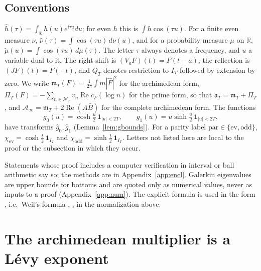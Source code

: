 \documentclass[11pt]{amsart}
\theoremstyle{definition}
\theoremstyle{remark}
\newcommand{\R}{\mathbb R}
\newcommand{\Rel}{\operatorname{Re}}
\newcommand{\IT}{I_T}
\newcommand{\gh}[1]{\widehat g_{#1}}
\newcommand{\nuh}{\widehat\nu}
\newcommand{\Fh}{\widehat F}
\newcommand{\cF}{c_F}
\newcommand{\NT}{\mathcal N_T}
\newcommand{\Ainf}{\mathcal A_\infty}
\newcommand{\PiT}{\Pi_T}
\newcommand{\mT}{\mathfrak m_T}
\begin{document}
\subsection{Conventions}\label{subsec:conv}
$\widehat h(\tau)=\int_\R h(u)e^{i\tau u}du$; for even $h$ this is $\int h\cos(\tau u)$. For a finite even
measure $\nu$, $\nuh(\tau)=\int\cos(\tau u)\,d\nu(u)$, and for a probability measure $\mu$ on $\R$,
$\check\mu(u)=\int\cos(\tau u)\,d\mu(\tau)$. The letter $\tau$ always denotes a frequency, and $u$ a
variable dual to it. The right shift is $(V_aF)(t)=F(t-a)$, the reflection is $(JF)(t)=F(-t)$, and $Q_T$
denotes restriction to $\IT$ followed by extension by zero. We write $\mT(F)=\frac1{2\pi}\int m|\Fh|^2$
for the archimedean form, $\PiT(F)=-\sum_{n\in\NT}v_n\Rel\cF(\log n)$ for the prime form, so that
$\mathfrak a_T=\mT+\PiT$, and $\Ainf=\mT+2\Rel(A\bar B)$ for the complete archimedean form. The functions
\begin{equation}\label{eq:g}
g_0(u)=\cosh\tfrac u2\,\mathbf 1_{|u|<2T},\qquad g_1(u)=u\sinh\tfrac u2\,\mathbf 1_{|u|<2T},
\end{equation}
have transforms $\gh0,\gh1$ (Lemma~\ref{lem:gbounds}). For a parity label
$\mathrm{par}\in\{\mathrm{ev},\mathrm{odd}\}$, $\chi_{\mathrm{ev}}=\cosh\frac t2\,\mathbf 1_{\IT}$ and
$\chi_{\mathrm{odd}}=\sinh\frac t2\,\mathbf 1_{\IT}$. Letters not listed here are local to the proof or
the subsection in which they occur.

Statements whose proof includes a computer verification in interval or ball arithmetic say so; the
methods are in Appendix~\ref{app:encl}. Galerkin eigenvalues are upper bounds for bottoms and are quoted
only as numerical values, never as inputs to a proof (Appendix~\ref{app:num}). The explicit formula is used
in the form \cite[Thm.~8.4]{Paper45}, i.e.\ Weil's formula \cite{Weil52}, \cite[Thm.~5.12]{IK}, in the
normalization above.


\section{The archimedean multiplier is a L\'evy exponent}\label{sec:levy}
\end{document}
